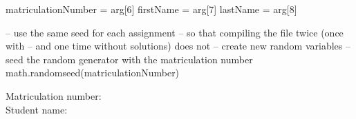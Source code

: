 \documentclass[a4paper]{exam}
\begin{document}
\begin{luacode*}
matriculationNumber = arg[6]
firstName = arg[7]
lastName = arg[8]

-- use the same seed for each assignment
-- so that compiling the file twice (once with
-- and one time without solutions) does not
-- create new random variables
-- seed the random generator with the matriculation number
math.randomseed(matriculationNumber)
\end{luacode*}

\noindent
Matriculation number: \\
Student name: 

\begin{questions}





\end{questions}
\end{document}
